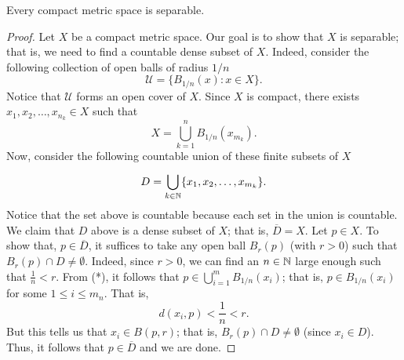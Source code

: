 \documentclass[a4paper]{article}
\begin{document}
\begin{problem}
    Every compact metric space is separable.
\end{problem}
\begin{proof}
Let \( X  \) be a compact metric space. Our goal is to show that \( X  \) is separable; that is, we need to find a countable dense subset of \( X  \). Indeed, consider the following collection of open balls of radius \( 1/n \)
\[  \mathcal{U} = \{ {B}_{1/n}(x):x \in X \}.   \]
Notice that \( \mathcal{U} \) forms an open cover of \( X  \). Since \( X  \) is compact, there exists \( {x}_{1}, {x}_{2}, \dots, {x}_{n_k} \in X   \) such that  
\[  X  = \bigcup_{ k = 1  }^{ n } {B}_{1/n}({x}_{{m}_{k}}). \tag{*} \]
Now, consider the following countable union of these finite subsets of \( X  \)
\[  D = \bigcup_{ k \in \mathbb{N}  }^{  } \{ {x}_{1}, {x}_{2}, \dots, {x}_{{m}_{k}}\}.  \]
Notice that the set above is countable because each set in the union is countable. We claim that \( D  \) above is a dense subset of \( X  \); that is, \( \overline{D} = X  \). Let \( p \in X  \). To show that, \( p \in \overline{D}\), it suffices to take any open ball \( {B}_{r}(p) \) (with \( r > 0 \)) such that \( {B}_{r}(p) \cap D \neq \emptyset \). Indeed, since \( r > 0  \), we can find an \( n \in \mathbb{N} \) large enough such that \( \frac{ 1 }{ n }  < r  \). From (*), it follows that \( p \in \bigcup_{ i= 1  }^{m} {B}_{1/n}({x}_{i}) \); that is, \( p \in {B}_{1/n}({x}_{i}) \) for some \( 1 \leq i \leq {m}_{n} \). That is,   
\[  d({x}_{i}, p) < \frac{ 1 }{ n }  < r. \]
But this tells us that \( {x}_{i} \in B(p,r)  \); that is, \( {B}_{r}(p) \cap D \neq \emptyset \) (since \( {x}_{i} \in D  \)). Thus, it follows that \( p \in \overline{D} \) and we are done.
\end{proof}
\end{document}
